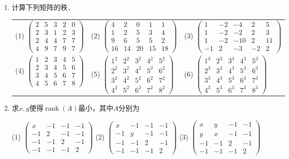 \documentclass[a4paper,fontset=windows]{ctexbook}
\theoremstyle{definition}
\DeclareMathOperator{\rank}{rank}
\begin{document}
\begin{enumerate}
\item 计算下列矩阵的秩．

\hspace*{-6pt}\begin{tabular}{l@{\qquad}l@{\qquad}l}
(1) $\begin{pmatrix}2&5&3&2&0 \\ 2&3&1&2&3 \\ 2&4&4&7&7 \\ 4&9&7&9&7\end{pmatrix}$ &
(2) $\begin{pmatrix}4&2&0&1&1 \\ 1&2&5&3&4 \\ 9&6&5&5&2 \\ 16&14&20&15&18\end{pmatrix}$ &
(3) $\begin{pmatrix}1&-2&-4&2&5 \\ 1&-2&-2&2&3 \\ 1&-2&-10&2&11 \\ -1&2&-3&-2&2\end{pmatrix}$ \\
(4) $\begin{pmatrix}1&2&3&4&5 \\ 2&3&4&5&6 \\ 3&4&5&6&7 \\ 4&5&6&7&8\end{pmatrix}$ &
(5) $\begin{pmatrix}1^2&2^2&3^2&4^2&5^2 \\ 2^2&3^2&4^2&5^2&6^2 \\ 3^2&4^2&5^2&6^2&7^2 \\ 4^2&5^2&6^2&7^2&8^2\end{pmatrix}$ &
(6) $\begin{pmatrix}1^3&2^3&3^3&4^3&5^3 \\ 2^3&3^3&4^3&5^3&6^3 \\ 3^3&4^3&5^3&6^3&7^3 \\ 4^3&5^3&6^3&7^3&8^3\end{pmatrix}$
\end{tabular}

\item 求$x,y$使得$\rank(A)$最小，其中$A$分别为

(1) $\begin{pmatrix}x&-1&-1&-1 \\ -1&2&-1&-1 \\ -1&-1&2&-1 \\ -1&-1&-1&2\end{pmatrix}$ \qquad
(2) $\begin{pmatrix}x&-1&-1&-1 \\ -1&y&-1&-1 \\ -1&-1&2&-1 \\ -1&-1&-1&2\end{pmatrix}$ \qquad
(3) $\begin{pmatrix}x&y&-1&-1 \\ y&x&-1&-1 \\ -1&-1&2&-1 \\ -1&-1&-1&2\end{pmatrix}$


\end{enumerate}
\end{document}
